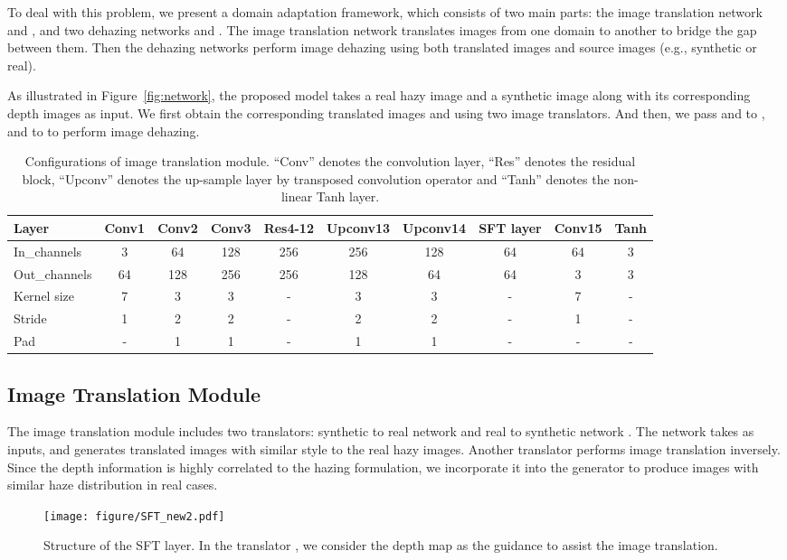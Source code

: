 \documentclass[10pt,twocolumn,letterpaper]{article}
\begin{document}
To deal with this problem, we present a domain adaptation framework, which consists of two main parts: the image translation network  and , and two dehazing networks  and . 
The image translation network translates images from one domain to another to bridge the gap between them.
Then the dehazing networks perform image dehazing using both translated images and source images (e.g., synthetic or real).

As illustrated in Figure~\ref{fig:network}, the proposed model takes a real hazy image  and a synthetic image  along with its corresponding depth images  as input. 
We first obtain the corresponding translated images  and  using two image translators. 
And then, we pass  and  to ,  and  to  to perform image dehazing.
 
\begin{table*}[t]
\footnotesize
\caption{Configurations of image translation module.
``Conv'' denotes the convolution layer, ``Res'' denotes the residual block, ``Upconv'' denotes the up-sample layer by transposed convolution operator and ``Tanh'' denotes the non-linear Tanh layer.}
\vspace{2mm}
\label{tab:tran_s2r}
\centering
\begin{tabular}{l|c|c|c|c|c|c|c|c|c}
\toprule
Layer        & Conv1 & Conv2 & Conv3   & Res4-12   & Upconv13  & Upconv14   & SFT layer  & Conv15 & Tanh  \\ \midrule
In\_channels  & 3     & 64    & 128      & 256      & 256      	& 128         & 64       & 64     & 3    \\
Out\_channels & 64    & 128   & 256      & 256      & 128       & 64          & 64       & 3      & 3    \\
Kernel size   & 7     & 3     & 3        & -        & 3        	& 3           & -        & 7      & -     \\
Stride        & 1     & 2     & 2        & -        & 2        	& 2           & -        & 1      & -     \\
Pad           & -     & 1     & 1        & -        & 1        	& 1           & -        & -      & -     \\ \bottomrule
\end{tabular}
\end{table*}

\subsection{Image Translation Module}
The image translation module includes two translators: synthetic to real network  and real to synthetic network .
The  network takes  as inputs, and generates translated images  with similar style to the real hazy images.
Another translator  performs image translation inversely.
Since the depth information is highly correlated to the hazing formulation, we incorporate it into the generator  to produce images with similar haze distribution in real cases.
\begin{figure}[t]
\centering
    \texttt{[image: figure/SFT\_new2.pdf]}
\caption{Structure of the SFT layer.
In the translator , we consider the depth map as the guidance to assist the image translation.
}
\label{fig:SFT_layer}
\end{figure}
\end{document}
